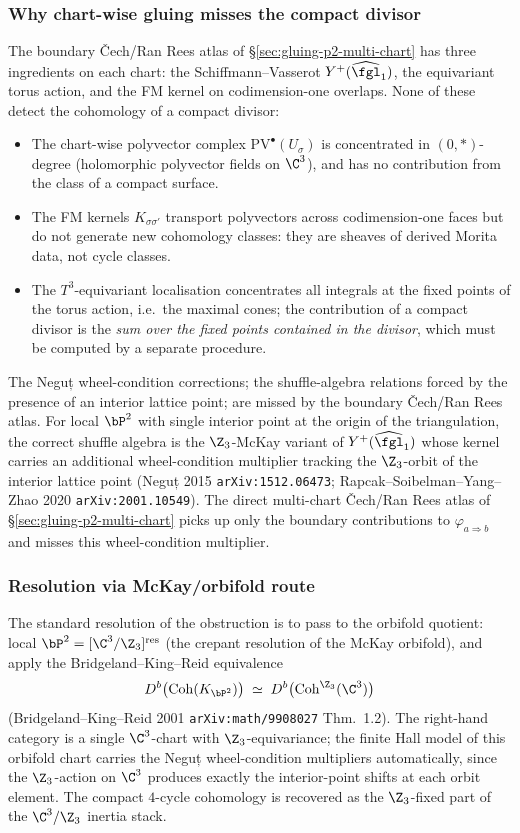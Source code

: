 \subsubsection{Why chart-wise gluing misses the compact divisor}

The boundary \v{C}ech/Ran Rees atlas of \S\ref{sec:gluing-p2-multi-chart} has
three ingredients on each chart: the Schiffmann--Vasserot
$Y^+(\widehat{\fgl}_1)$, the equivariant torus action, and the FM kernel
on codimension-one overlaps. None of these detect the cohomology of a
compact divisor:

\begin{itemize}
\item The chart-wise polyvector complex $\mathrm{PV}^\bullet(U_\sigma)$ is
 concentrated in $(0, *)$-degree (holomorphic polyvector fields on
 $\C^3$), and has no contribution from the class of a compact surface.
\item The FM kernels $K_{\sigma \sigma'}$ transport polyvectors across
 codimension-one faces but do not generate new cohomology classes:
 they are sheaves of derived Morita data, not cycle classes.
\item The $T^3$-equivariant localisation concentrates all integrals at
 the fixed points of the torus action, i.e.\ the maximal cones; the
 contribution of a compact divisor is the \emph{sum over the fixed
 points contained in the divisor}, which must be computed by a separate
 procedure.
\end{itemize}
The Neguț wheel-condition corrections; the shuffle-algebra
relations forced by the presence of an interior lattice point; are
missed by the boundary \v{C}ech/Ran Rees atlas. For local $\bP^2$ with single
interior point at the origin of the triangulation, the correct shuffle
algebra is the $\Z_3$-McKay variant of $Y^+(\widehat{\fgl}_1)$ whose
kernel carries an additional wheel-condition multiplier tracking the
$\Z_3$-orbit of the interior lattice point (Neguț 2015
\texttt{arXiv:1512.06473}; Rapcak--Soibelman--Yang--Zhao 2020
\texttt{arXiv:2001.10549}). The direct multi-chart \v{C}ech/Ran Rees atlas of
\S\ref{sec:gluing-p2-multi-chart} picks up only the boundary contributions
to $\varphi_{a \Rightarrow b}$ and misses this wheel-condition
multiplier.

\subsubsection{Resolution via McKay/orbifold route}

The standard resolution of the obstruction is to pass to the orbifold
quotient: local $\bP^2 = [\C^3/\Z_3]^{\mathrm{res}}$ (the crepant
resolution of the McKay orbifold), and apply the Bridgeland--King--Reid
equivalence
\[
 D^b\bigl(\mathrm{Coh}(K_{\bP^2})\bigr) \;\simeq\; D^b\bigl(\mathrm{Coh}^{\Z_3}(\C^3)\bigr)
\]
(Bridgeland--King--Reid 2001 \texttt{arXiv:math/9908027} Thm.~1.2). The
right-hand category is a single $\C^3$-chart with $\Z_3$-equivariance;
the finite Hall model of this orbifold chart carries the Neguț wheel-condition
multipliers automatically, since the $\Z_3$-action on $\C^3$ produces
exactly the interior-point shifts at each orbit element. The compact
$4$-cycle cohomology is recovered as the $\Z_3$-fixed part of the
$\C^3/\Z_3$ inertia stack.


